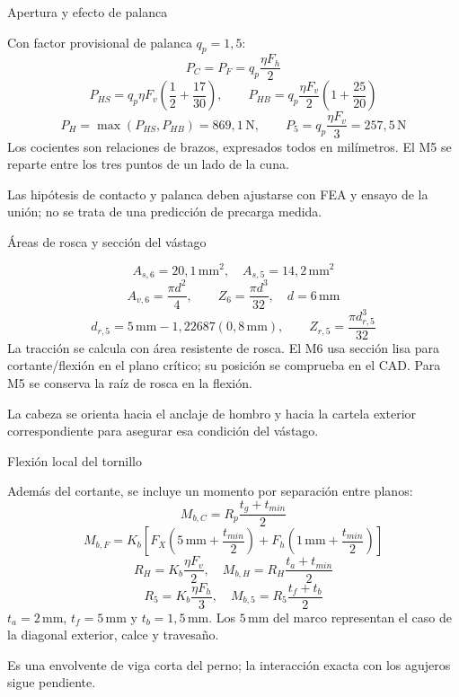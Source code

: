 \documentclass[10pt,aspectratio=169]{beamer}
\newcommand{\mm}{\,\mathrm{mm}}
\newcommand{\N}{\,\mathrm{N}}
\newcommand{\mcref}{Guía de diseño}
\begin{document}
\gdef\mcref{Mathcad: sección 18 / pág. 30-31}
\begin{frame}[t]{Apertura y efecto de palanca}

\small
Con factor provisional de palanca $q_p=1{,}5$:
\[
P_C=P_F=q_p\frac{\eta F_h}{2}
\]
\[
P_{HS}=q_p\eta F_v\left(\frac12+\frac{17}{30}\right),\qquad
P_{HB}=q_p\frac{\eta F_v}{2}\left(1+\frac{25}{20}\right)
\]
\[
P_H=\max(P_{HS},P_{HB})=869{,}1\N,\qquad
P_5=q_p\frac{\eta F_v}{3}=257{,}5\N
\]
Los cocientes son relaciones de brazos, expresados todos en milímetros. El M5 se reparte entre los tres puntos de un lado de la cuna.

Las hipótesis de contacto y palanca deben ajustarse con FEA y ensayo de la unión; no se trata de una predicción de precarga medida.

\end{frame}

\gdef\mcref{Mathcad: sección 19 / pág. 32-33}
\begin{frame}[t]{Áreas de rosca y sección del vástago}

\[
A_{s,6}=20{,}1\,\mathrm{mm^2},\quad A_{s,5}=14{,}2\,\mathrm{mm^2}
\]
\[
A_{v,6}=\frac{\pi d^2}{4},\qquad Z_6=\frac{\pi d^3}{32},\quad d=6\mm
\]
\[
d_{r,5}=5\mm-1{,}22687(0{,}8\mm),\qquad
Z_{r,5}=\frac{\pi d_{r,5}^3}{32}
\]
La tracción se calcula con área resistente de rosca. El M6 usa sección lisa para cortante/flexión en el plano crítico; su posición se comprueba en el CAD. Para M5 se conserva la raíz de rosca en la flexión.

La cabeza se orienta hacia el anclaje de hombro y hacia la cartela exterior correspondiente para asegurar esa condición del vástago.

\end{frame}

\gdef\mcref{Mathcad: sección 19 / pág. 32-33}
\begin{frame}[t]{Flexión local del tornillo}

\small
Además del cortante, se incluye un momento por separación entre planos:
\[
M_{b,C}=R_p\frac{t_g+t_{min}}2
\]
\[
M_{b,F}=K_b\left[F_X\left(5\mm+\frac{t_{min}}2\right)+F_h\left(1\mm+\frac{t_{min}}2\right)\right]
\]
\[
R_H=K_b\frac{\eta F_v}{2},\quad M_{b,H}=R_H\frac{t_a+t_{min}}2
\]
\[
R_5=K_b\frac{\eta F_h}{3},\quad M_{b,5}=R_5\frac{t_f+t_b}{2}
\]
$t_a=2\mm$, $t_f=5\mm$ y $t_b=1{,}5\mm$. Los $5\mm$ del marco representan el caso de la diagonal exterior, calce y travesaño.

Es una envolvente de viga corta del perno; la interacción exacta con los agujeros sigue pendiente.

\end{frame}
\end{document}
